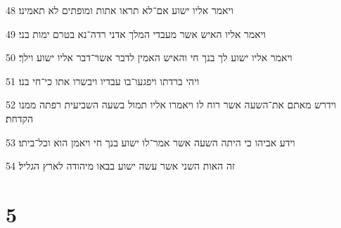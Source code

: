 \par 48 ויאמר אליו ישוע אם־לא תראו אתות ומופתים לא תאמינו׃
\par 49 ויאמר אליו האיש אשר מעבדי המלך אדני רדה־נא בטרם ימות בני׃
\par 50 ויאמר אליו ישוע לך בנך חי והאיש האמין לדבר אשר־דבר אליו ישוע וילך׃
\par 51 ויהי ברדתו ויפגעו־בו עבדיו ויבשרו אתו כי־חי בנו׃
\par 52 וידרש מאתם את־השעה אשר רוח לו ויאמרו אליו תמול בשעה השביעית רפתה ממנו הקדחת׃
\par 53 וידע אביהו כי היתה השעה אשר אמר־לו ישוע בנך חי ויאמן הוא וכל־ביתו׃
\par 54 זה האות השני אשר עשה ישוע בבאו מיהודה לארץ הגליל׃

\chapter{5}

